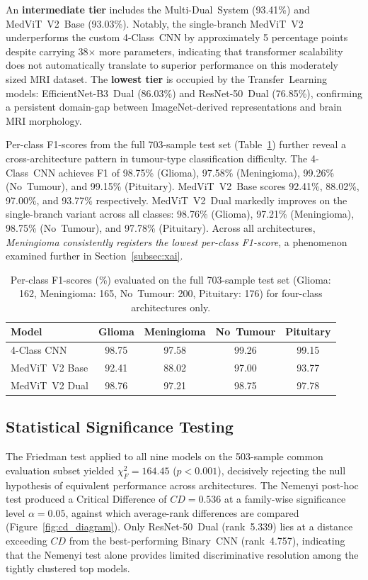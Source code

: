 An \textbf{intermediate tier} includes the Multi-Dual~System (93.41\%) and
MedViT~V2~Base (93.03\%). Notably, the single-branch MedViT~V2 underperforms
the custom 4-Class~CNN by approximately 5 percentage points despite carrying
38$\times$ more parameters, indicating that transformer scalability does not
automatically translate to superior performance on this moderately sized MRI
dataset. The \textbf{lowest tier} is occupied by the Transfer~Learning models:
EfficientNet-B3~Dual (86.03\%) and ResNet-50~Dual (76.85\%), confirming a
persistent domain-gap between ImageNet-derived representations and brain MRI
morphology.

Per-class F1-scores from the full 703-sample test set (Table~\ref{tab:perclass})
further reveal a cross-architecture pattern in tumour-type classification
difficulty. The 4-Class~CNN achieves F1 of 98.75\% (Glioma), 97.58\%
(Meningioma), 99.26\% (No~Tumour), and 99.15\% (Pituitary).
MedViT~V2~Base scores 92.41\%, 88.02\%, 97.00\%, and 93.77\% respectively.
MedViT~V2~Dual markedly improves on the single-branch variant across all
classes: 98.76\% (Glioma), 97.21\% (Meningioma), 98.75\% (No~Tumour), and
97.78\% (Pituitary). Across all architectures, \emph{Meningioma consistently
registers the lowest per-class F1-score}, a phenomenon examined further in
Section~\ref{subsec:xai}.

\begin{table}[ht]
\centering
\caption{Per-class F1-scores (\%) evaluated on the full 703-sample test set
  (Glioma: 162, Meningioma: 165, No~Tumour: 200, Pituitary: 176) for
  four-class architectures only.}
\label{tab:perclass}
\begin{tabular}{lcccc}
\toprule
Model & Glioma & Meningioma & No~Tumour & Pituitary \\
\midrule
4-Class CNN         & 98.75 & 97.58 & 99.26 & 99.15 \\
MedViT~V2 Base      & 92.41 & 88.02 & 97.00 & 93.77 \\
MedViT~V2 Dual      & 98.76 & 97.21 & 98.75 & 97.78 \\
\bottomrule
\end{tabular}
\end{table}

\subsection{Statistical Significance Testing}
\label{subsec:stats}

The Friedman test applied to all nine models on the 503-sample common
evaluation subset yielded $\chi^2_F = 164.45$ ($p < 0.001$), decisively
rejecting the null hypothesis of equivalent performance across architectures.
The Nemenyi post-hoc test produced a Critical Difference of $CD = 0.536$ at
a family-wise significance level $\alpha = 0.05$, against which average-rank
differences are compared (Figure~\ref{fig:cd_diagram}). Only ResNet-50~Dual
(rank~5.339) lies at a distance exceeding $CD$ from the best-performing
Binary~CNN (rank~4.757), indicating that the Nemenyi test alone provides
limited discriminative resolution among the tightly clustered top models.

